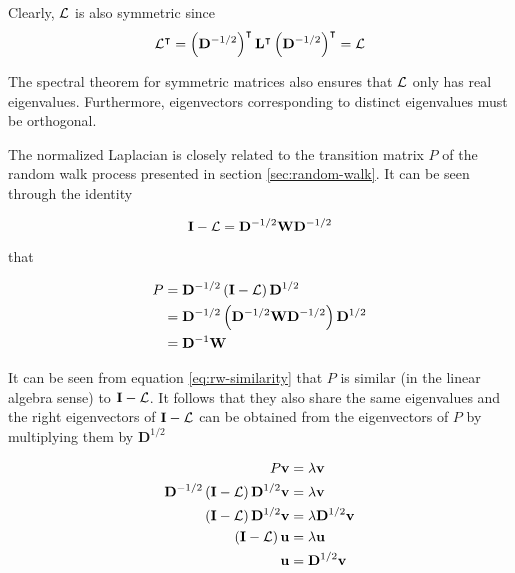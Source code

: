 Clearly, $\mathbf{\mathcal{L}}$ is also symmetric since
\begin{align}
\mathbf{\mathcal{L}}^\intercal = \left(\mathbf{D}^{-1/2} \right)^\intercal \mathbf{L}^\intercal \left( \mathbf{D}^{-1/2} \right)^\intercal = \mathbf{\mathcal{L}}
\end{align}

The spectral theorem for symmetric matrices \cite{Watkins2010} also ensures that
$\mathbf{\mathcal{L}}$ only has real eigenvalues. Furthermore, eigenvectors corresponding to
distinct eigenvalues must be orthogonal.

The normalized Laplacian is closely related to the transition matrix $P$ of the random
walk process presented in section \ref{sec:random-walk}. It can be seen through the
identity 

\begin{equation}
\mathbf{I} - \mathbf{\mathcal{L}} = \mathbf{D}^{-1/2} \mathbf{W} \mathbf{D}^{-1/2}
\end{equation}

that

\begin{align}
P &= \mathbf{D}^{-1/2} \left( \mathbf{I} - \mathbf{\mathcal{L}} \right) \mathbf{D}^{1/2} \label{eq:rw-similarity} \\
 &= \mathbf{D}^{-1/2} \left( \mathbf{D}^{-1/2} \mathbf{W} \mathbf{D}^{-1/2} \right) \mathbf{D}^{1/2} \notag \\
 &= \mathbf{D}^{-1} \mathbf{W} \notag
\end{align}

It can be seen from equation \ref{eq:rw-similarity} that $P$ is similar (in the
linear algebra sense) to $\mathbf{I} - \mathbf{\mathcal{L}}$. It follows that they also share
the same eigenvalues and the right eigenvectors of $\mathbf{I} -\mathbf{\mathcal{L}}$ can be
obtained from the eigenvectors of $P$ by multiplying them by $\mathbf{D}^{1/2}$

\begin{align}
P\mathbf{v} &= \lambda \mathbf{v} \notag \\
\mathbf{D}^{-1/2} \left( \mathbf{I} - \mathbf{\mathcal{L}} \right) \mathbf{D}^{1/2} \mathbf{v}  &= \lambda \mathbf{v} \notag \\
\left( \mathbf{I} - \mathbf{\mathcal{L}} \right) \mathbf{D}^{1/2} \mathbf{v}  &= \lambda \mathbf{D}^{1/2} \mathbf{v} \notag \\
\left( \mathbf{I} - \mathbf{\mathcal{L}} \right) \mathbf{u} &= \lambda \mathbf{u} \\
\mathbf{u} &= \mathbf{D}^{1/2} \mathbf{v}
\label{eq:similarity-rw}
\end{align}

